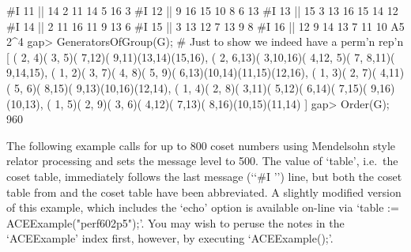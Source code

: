 #I      11 ||     14      2     11     14      5     16      3
#I      12 ||      9     16     15     10      8      6     13
#I      13 ||     15      3     13     16     15     14     12
#I      14 ||      2     11     16     11      9     13      6
#I      15 ||      3     13     12      7     13      9      8
#I      16 ||     12      9     14     13      7     11     10
A5 2^4
gap> GeneratorsOfGroup(G); # Just to show we indeed have a perm'n rep'n
[ ( 2, 4)( 3, 5)( 7,12)( 9,11)(13,14)(15,16), 
  ( 2, 6,13)( 3,10,16)( 4,12, 5)( 7, 8,11)( 9,14,15), 
  ( 1, 2)( 3, 7)( 4, 8)( 5, 9)( 6,13)(10,14)(11,15)(12,16), 
  ( 1, 3)( 2, 7)( 4,11)( 5, 6)( 8,15)( 9,13)(10,16)(12,14), 
  ( 1, 4)( 2, 8)( 3,11)( 5,12)( 6,14)( 7,15)( 9,16)(10,13), 
  ( 1, 5)( 2, 9)( 3, 6)( 4,12)( 7,13)( 8,16)(10,15)(11,14) ]
gap> Order(G);
960
\endexample


The following example calls {\ACE} for up to 800 coset  numbers  using
Mendelsohn style relator processing and sets the message level to 500.
The value of `table', i.e.~the {\GAP} coset table, immediately follows
the last {\ACE} message (\lq{}`\#I '') line, but both the coset  table
from {\ACE} and the  {\GAP}  coset  table  have  been  abbreviated.  A
slightly modified version of this example, which includes  the  `echo'
option is available on-line via `table  :=  ACEExample("perf602p5");'.
You may wish to peruse the notes  in  the  `ACEExample'  index  first,
however, by executing `ACEExample();'.

